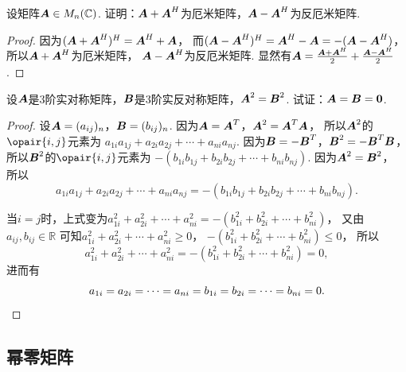 \begin{example}
设矩阵\(\boldsymbol{A} \in M_n(\mathbb{C})\).
证明：\(\boldsymbol{A}+\boldsymbol{A}^H\)为厄米矩阵，\(\boldsymbol{A}-\boldsymbol{A}^H\)为反厄米矩阵.
\begin{proof}
因为\((\boldsymbol{A}+\boldsymbol{A}^H)^H = \boldsymbol{A}^H+\boldsymbol{A}\)，
而\((\boldsymbol{A}-\boldsymbol{A}^H)^H = \boldsymbol{A}^H - \boldsymbol{A} = -(\boldsymbol{A}-\boldsymbol{A}^H)\)，
所以\(\boldsymbol{A}+\boldsymbol{A}^H\)为厄米矩阵，
\(\boldsymbol{A}-\boldsymbol{A}^H\)为反厄米矩阵.
显然有\(\boldsymbol{A} = \frac{\boldsymbol{A} + \boldsymbol{A}^H}{2} + \frac{\boldsymbol{A} - \boldsymbol{A}^H}{2}\).
\end{proof}
\end{example}

\begin{example}
设\(\boldsymbol{A}\)是3阶实对称矩阵，\(\boldsymbol{B}\)是3阶实反对称矩阵，\(\boldsymbol{A}^2 = \boldsymbol{B}^2\).
试证：\(\boldsymbol{A} = \boldsymbol{B} = \boldsymbol0\).
\begin{proof}
设\(\boldsymbol{A} = (a_{ij})_n\)，\(\boldsymbol{B} = (b_{ij})_n\).
因为\(\boldsymbol{A} = \boldsymbol{A}^T\)，\(\boldsymbol{A}^2 = \boldsymbol{A}^T \boldsymbol{A}\)，
所以\(\boldsymbol{A}^2\)的\(\opair{i,j}\)元素为
\(a_{1i} a_{1j} + a_{2i} a_{2j} + \dotsb + a_{ni} a_{nj}\).
因为\(\boldsymbol{B} = -\boldsymbol{B}^T\)，\(\boldsymbol{B}^2 = -\boldsymbol{B}^T \boldsymbol{B}\)，
所以\(\boldsymbol{B}^2\)的\(\opair{i,j}\)元素为
\(-(b_{1i} b_{1j} + b_{2i} b_{2j} + \dotsb + b_{ni} b_{nj})\).
因为\(\boldsymbol{A}^2 = \boldsymbol{B}^2\)，
所以\begin{equation*}
	a_{1i} a_{1j} + a_{2i} a_{2j} + \dotsb + a_{ni} a_{nj}
	= -(b_{1i} b_{1j} + b_{2i} b_{2j} + \dotsb + b_{ni} b_{nj}).
\end{equation*}

当\(i=j\)时，上式变为\(a_{1i}^2 + a_{2i}^2 + \dotsb + a_{ni}^2
= -(b_{1i}^2 + b_{2i}^2 + \dotsb + b_{ni}^2)\)，
又由\(a_{ij},b_{ij} \in \mathbb{R}\)
可知\(a_{1i}^2 + a_{2i}^2 + \dotsb + a_{ni}^2 \geq 0\)，
\(-(b_{1i}^2 + b_{2i}^2 + \dotsb + b_{ni}^2) \leq 0\)，
所以\begin{equation*}
	a_{1i}^2 + a_{2i}^2 + \dotsb + a_{ni}^2
	= -(b_{1i}^2 + b_{2i}^2 + \dotsb + b_{ni}^2) = 0,
\end{equation*}
进而有\begin{equation*}
	a_{1i} = a_{2i} = \dotsb = a_{ni} = b_{1i} = b_{2i} = \dotsb = b_{ni} = 0.
	\qedhere
\end{equation*}
\end{proof}
\end{example}

\subsection{幂零矩阵}

